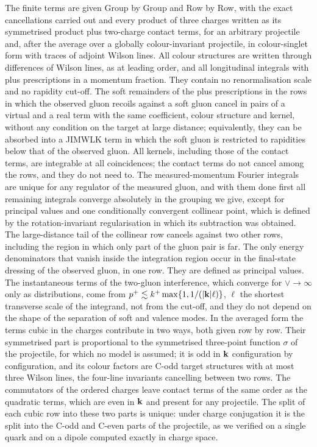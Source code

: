 The finite terms are given Group by Group and Row by Row, with the exact cancellations carried out and every product of three charges written as its symmetrised product plus two-charge contact terms, for an arbitrary projectile and, after the average over a globally colour-invariant projectile, in colour-singlet form with traces of adjoint Wilson lines. All colour structures are written through differences of Wilson lines, as at leading order, and all longitudinal integrals with plus prescriptions in a momentum fraction. They contain no renormalisation scale and no rapidity cut-off. The soft remainders of the plus prescriptions in the rows in which the observed gluon recoils against a soft gluon cancel in pairs of a virtual and a real term with the same coefficient, colour structure and kernel, without any condition on the target at large distance; equivalently, they can be absorbed into a JIMWLK term in which the soft gluon is restricted to rapidities below that of the observed gluon. All kernels, including those of the contact terms, are integrable at all coincidences; the contact terms do not cancel among the rows, and they do not need to. The measured-momentum Fourier integrals are unique for any regulator of the measured gluon, and with them done first all remaining integrals converge absolutely in the grouping we give, except for principal values and one conditionally convergent collinear point, which is defined by the rotation-invariant regularisation in which its subtraction was obtained. The large-distance tail of the collinear row cancels against two other rows, including the region in which only part of the gluon pair is far. The only energy denominators that vanish inside the integration region occur in the final-state dressing of the observed gluon, in one row. They are defined as principal values. The instantaneous terms of the two-gluon interference, which converge for $\vee\to\infty$ only as distributions, come from $p^+\lesssim k^+\max\{1,1/(|\mathbf{k}|\ell)\}$, $\ell$ the shortest transverse scale of the integrand, not from the cut-off, and they do not depend on the shape of the separation of soft and valence modes. In the averaged form the terms cubic in the charges contribute in two ways, both given row by row. Their symmetrised part is proportional to the symmetrised three-point function $\sigma$ of the projectile, for which no model is assumed; it is odd in $\mathbf{k}$ configuration by configuration, and its colour factors are C-odd target structures with at most three Wilson lines, the four-line invariants cancelling between two rows. The commutators of the ordered charges leave contact terms of the same order as the quadratic terms, which are even in $\mathbf{k}$ and present for any projectile. The split of each cubic row into these two parts is unique: under charge conjugation it is the split into the C-odd and C-even parts of the projectile, as we verified on a single quark and on a dipole computed exactly in charge space.

